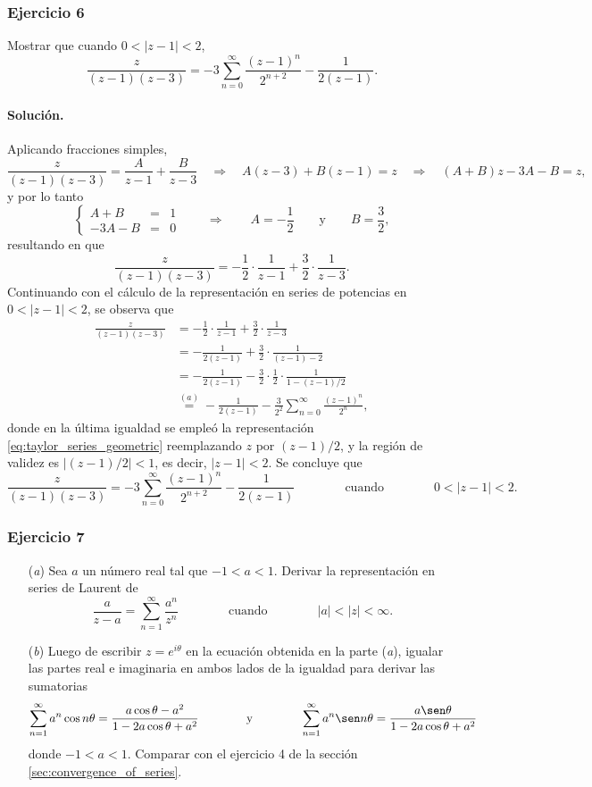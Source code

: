 \documentclass[a4paper]{report}
\begin{document}
\subsubsection*{Ejercicio 6}

Mostrar que cuando \(0<|z-1|<2\),
\[
 \frac{z}{(z-1)(z-3)}=-3\sum_{n=0}^\infty\frac{(z-1)^n}{2^{n+2}}-\frac{1}{2(z-1)}.
\]

\paragraph{Solución.} Aplicando fracciones simples,
\[
 \frac{z}{(z-1)(z-3)}=\frac{A}{z-1}+\frac{B}{z-3}
 \quad\Rightarrow\quad 
 A(z-3)+B(z-1)=z
 \quad\Rightarrow\quad
 (A+B)z-3A-B=z,
\]
y por lo tanto
\[
  \left\{ 
 \begin{array}{rcl}
  A+B&=&1\\
  -3A-B&=&0
 \end{array}
 \right.
 \qquad\Rightarrow\qquad 
 A=-\frac{1}{2}\qquad\textrm{y}\qquad B=\frac{3}{2},
\]
resultando en que 
\[
 \frac{z}{(z-1)(z-3)}=-\frac{1}{2}\cdot\frac{1}{z-1}+\frac{3}{2}\cdot\frac{1}{z-3}.
\]
Continuando con el cálculo de la representación en series de potencias en \(0<|z-1|<2\), se observa que 
\begin{align*}
 \frac{z}{(z-1)(z-3)}&=-\frac{1}{2}\cdot\frac{1}{z-1}+\frac{3}{2}\cdot\frac{1}{z-3}\\
  &=-\frac{1}{2(z-1)}+\frac{3}{2}\cdot\frac{1}{(z-1)-2}\\
  &=-\frac{1}{2(z-1)}-\frac{3}{2}\cdot\frac{1}{2}\cdot\frac{1}{1-(z-1)/2}\\
  &\overset{(a)}{=}-\frac{1}{2(z-1)}-\frac{3}{2^2}\sum_{n=0}^\infty\frac{(z-1)^n}{2^n},
\end{align*}
donde en la última igualdad se empleó la representación \ref{eq:taylor_series_geometric} reemplazando \(z\) por \((z-1)/2\), y la región de validez es \(|(z-1)/2|<1\), es decir, \(|z-1|<2\). Se concluye que 
\[
 \frac{z}{(z-1)(z-3)}=-3\sum_{n=0}^\infty\frac{(z-1)^n}{2^{n+2}}-\frac{1}{2(z-1)}
 \qquad\qquad\textrm{cuando}\qquad\qquad
 0<|z-1|<2.
\]

\subsubsection*{Ejercicio 7}

\begin{enumerate}
 \item[(\textit{a})] Sea \(a\) un número real tal que \(-1<a<1\). Derivar la representación en series de Laurent de 
 \[
  \frac{a}{z-a}=\sum_{n=1}^\infty\frac{a^n}{z^n}
  \qquad\qquad\textrm{cuando}\qquad\qquad
  |a|<|z|<\infty.
 \]
 \item[(\textit{b})] Luego de escribir \(z=e^{i\theta}\) en la ecuación obtenida en la parte (\textit{a}), igualar las partes real e imaginaria en ambos lados de la igualdad para derivar las sumatorias 
 \[
  \sum_{n=1}^\infty a^n\cos n\theta=\frac{a\cos\theta-a^2}{1-2a\cos\theta+a^2}
  \qquad\qquad\textrm{y}\qquad\qquad
  \sum_{n=1}^\infty a^n\sen n\theta=\frac{a\sen\theta}{1-2a\cos\theta+a^2}
 \]
 donde \(-1<a<1\). Comparar con el ejercicio 4 de la sección \ref{sec:convergence_of_series}.
\end{enumerate}
\end{document}
